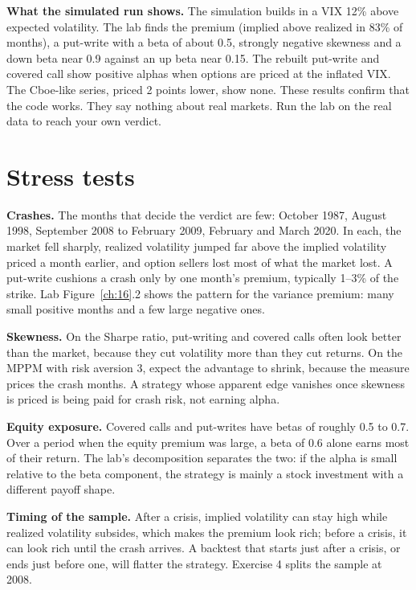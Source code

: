 \textbf{What the simulated run shows.} The simulation builds in a VIX 12\% above expected volatility. The lab finds the premium (implied above realized in 83\% of months), a put-write with a beta of about 0.5, strongly negative skewness and a down beta near 0.9 against an up beta near 0.15. The rebuilt put-write and covered call show positive alphas when options are priced at the inflated VIX. The Cboe-like series, priced 2 points lower, show none. These results confirm that the code works. They say nothing about real markets. Run the lab on the real data to reach your own verdict.

\section{Stress tests}
\label{sec:16-stress}

\textbf{Crashes.} The months that decide the verdict are few: October 1987, August 1998, September 2008 to February 2009, February and March 2020. In each, the market fell sharply, realized volatility jumped far above the implied volatility priced a month earlier, and option sellers lost most of what the market lost. A put-write cushions a crash only by one month's premium, typically 1--3\% of the strike. Lab Figure~\ref{ch:16}.2 shows the pattern for the variance premium: many small positive months and a few large negative ones.

\textbf{Skewness.} On the Sharpe ratio, put-writing and covered calls often look better than the market, because they cut volatility more than they cut returns. On the MPPM with risk aversion 3, expect the advantage to shrink, because the measure prices the crash months. A strategy whose apparent edge vanishes once skewness is priced is being paid for crash risk, not earning alpha.

\textbf{Equity exposure.} Covered calls and put-writes have betas of roughly 0.5 to 0.7. Over a period when the equity premium was large, a beta of 0.6 alone earns most of their return. The lab's decomposition separates the two: if the alpha is small relative to the beta component, the strategy is mainly a stock investment with a different payoff shape.

\textbf{Timing of the sample.} After a crisis, implied volatility can stay high while realized volatility subsides, which makes the premium look rich; before a crisis, it can look rich until the crash arrives. A backtest that starts just after a crisis, or ends just before one, will flatter the strategy. Exercise 4 splits the sample at 2008.

